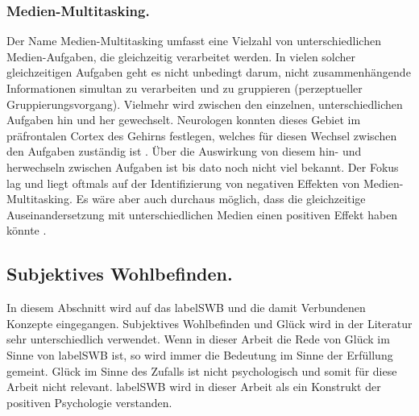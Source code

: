 \subsubsection{Medien-Multitasking.} Der Name Medien-Multitasking umfasst eine Vielzahl von unterschiedlichen Medien-Aufgaben, die gleichzeitig verarbeitet werden. In vielen solcher gleichzeitigen Aufgaben geht es nicht unbedingt darum, nicht zusammenhängende Informationen simultan zu verarbeiten und zu gruppieren (perzeptueller Gruppierungsvorgang). Vielmehr wird zwischen den einzelnen, unterschiedlichen Aufgaben hin und her gewechselt. Neurologen konnten dieses Gebiet im präfrontalen Cortex des Gehirns festlegen, welches für diesen Wechsel zwischen den Aufgaben zuständig ist \cite{Wallis2006, Wood2003}. Über die Auswirkung von diesem hin- und herwechseln zwischen Aufgaben ist bis dato noch nicht viel bekannt. Der Fokus lag und liegt oftmals auf der Identifizierung von negativen Effekten von Medien-Multitasking. Es wäre aber auch durchaus möglich, dass die gleichzeitige Auseinandersetzung mit unterschiedlichen Medien einen positiven Effekt haben könnte \cite{Foehr2006}.   

\subsection{Subjektives Wohlbefinden.}\label{subsection.subjektivesWohlbefinden}
In diesem Abschnitt wird auf das \gls{labelSWB} und die damit Verbundenen Konzepte eingegangen. Subjektives Wohlbefinden und Glück wird in der Literatur sehr unterschiedlich verwendet. Wenn in dieser Arbeit die Rede von Glück im Sinne von \gls{labelSWB} ist, so wird immer die Bedeutung im Sinne der Erfüllung gemeint. Glück im Sinne des Zufalls ist nicht psychologisch und somit für diese Arbeit nicht relevant. \Gls{labelSWB} wird in dieser Arbeit als ein Konstrukt der positiven Psychologie verstanden. 

